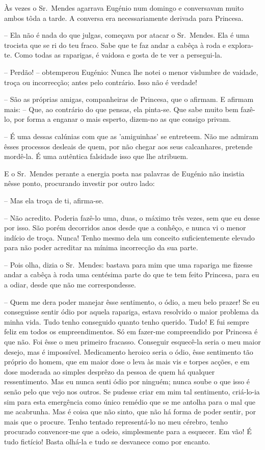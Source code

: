 \documentclass[9pt]{article}
\begin{document}
Às vezes o Sr.\ Mendes agarrava Eugé\-nio num domingo e conversavam
muito ambos tôda a tarde. A conversa era necessariamente derivada para Princesa.

-- Ela não é nada do que julgas, começava por atacar o Sr.\ Mendes.
Ela é uma trocista que se ri do teu fraco. Sabe que te faz andar a cabêça à roda e explora-te. Como todas as raparigas, é vaidosa e gosta
de te ver a persegui-la.

-- Perdão! -- obtemperou Eugé\-nio: Nunca lhe notei o menor vislumbre
de vaidade, troça ou incorrec\-ção; antes pelo contrário. Isso não é verdade!

-- São as próprias amigas, companheiras de Princesa, que o afirmam.
E afirmam mais: -- Que, ao contrário do que pensas, ela pinta-se. Que
sabe muito bem fazê-lo, por forma a enganar o mais esperto, dizem-no
as que consigo privam.

-- É uma dessas calúnias com que as 'amiguinhas' se entreteem.
Não me admiram êsses processos desleais de quem, por não chegar aos
seus calcanhares, pretende mordê-la. É uma autêntica falsidade isso que lhe atribuem.

E o Sr.\ Mendes perante a energia posta nas palavras de Eugé\-nio
não insistia nêsse ponto, procurando investir por outro lado:

-- Mas ela troça de ti, afirma-se.

-- Não acredito. Poderia fazê-lo uma, duas, o máximo três vezes, sem
que eu desse por isso. São porém decorridos anos desde que a conhêço,
e nunca vi o menor indício de troça. Nunca! Tenho mesmo dela um con\-ceito
suficientemente elevado para não poder acreditar na mínima incorrec\-ção da sua parte.

-- Pois o\-lha, dizia o Sr.\ Mendes: bastava para mim que uma rapariga me fizesse andar a cabêça à roda uma centésima parte do que te tem
feito Princesa, para eu a odiar, desde que não me correspondesse.

-- Quem me dera poder manejar êsse sentimento, o ódio, a meu
belo prazer! Se eu conseguisse sentir ódio por aquela rapariga, estava resolvido o maior problema da minha vida. Tudo tenho conseguido
quanto tenho querido. Tudo! E fui sempre feliz em todos os empreendimentos. Só em fazer-me compreendido por Princesa é que não. Foi êsse o meu primeiro fracasso. Conseguir esquecê-la seria o meu maior
desejo, mas é impossível. Medicamento heroico seria o ódio, êsse sentimento tão próprio do homem, que em maior dose o leva às mais vis e torpes ac\-ções, e em dose moderada ao simples desprêzo da pessoa de quem
há qualquer ressentimento. Mas eu nunca senti ódio por nin\-guém;
nunca soube o que isso é senão pelo que vejo nos outros. Se pudesse
criar em mim tal sentimento, criá-lo-ia sim para esta emergência como único remédio que se me anto\-lha para o mal que me acabrunha. Mas
é coisa que não sinto, que não há forma de poder sentir, por mais que
o procure. Tenho tentado representá-lo no meu cérebro, tenho procurado convencer-me que a odeio, simplesmente para a esque\-cer. Em vão!
É tudo fictício! Basta o\-lhá-la e tudo se desvanece como por encanto.
\end{document}
